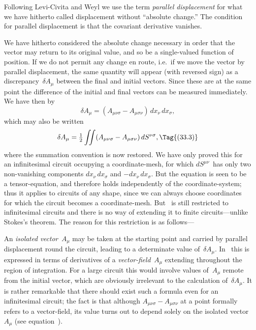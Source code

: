 \documentclass[12pt]{book}
\begin{document}
Following Levi-Civita and Weyl we use the term \emph{parallel displacement} for
%
%
what we have hitherto called displacement without ``absolute change.'' The
condition for parallel displacement is that the covariant derivative vanishes.

We have hitherto considered the absolute change necessary in order that
the vector may return to its original value, and so be a single-valued function
of position. If we do not permit any change en route, i.e.\ if we move the vector
by parallel displacement, the same quantity will appear (with reversed sign)
as a discrepancy~$\delta A_{\mu}$ between the final and initial vectors. Since these are at
the same point the difference of the initial and final vectors can be measured
immediately. We have then by~
\[
\delta A_{\mu} = (A_{\mu\nu\sigma} - A_{\mu\sigma\nu})\, dx_{\nu}\, dx_{\sigma},
\]
which may also be written
\[
\delta A_{\mu} = \tfrac{1}{2} \iint (A_{\mu\nu\sigma} - A_{\mu\sigma\nu})\, dS^{\nu\sigma},
\Tag{(33.3)}
\]
where the summation convention is now restored. We have only proved this
for an infinitesimal circuit occupying a coordinate-mesh, for which $dS^{\mu\nu}$~has
only two non-vanishing components $dx_{\nu}\, dx_{\sigma}$ and $-dx_{\nu}\, dx_{\sigma}$. But the equation
is seen to be a tensor-equation, and therefore holds independently of the
coordinate-system; thus it applies to circuits of any shape, since we can always
choose coordinates for which the circuit becomes a coordinate-mesh. But ~is
still restricted to infinitesimal circuits and there is no way of extending it
to finite circuits---unlike Stokes's theorem. The reason for this restriction is as
follows---

An \emph{isolated vector~$A_{\mu}$} may be taken at the starting point and carried by
parallel displacement round the circuit, leading to a determinate value of~$\delta A_{\mu}$.
%
%
In~ this is expressed in terms of derivatives of a \emph{vector-field~$A_{\mu}$} extending
throughout the region of integration. For a large circuit this would involve
values of~$A_{\mu}$ remote from the initial vector, which are obviously irrelevant to
the calculation of~$\delta A_{\mu}$. It is rather remarkable that there should exist such
a formula even for an infinitesimal circuit; the fact is that although $A_{\mu\nu\sigma} - A_{\mu\sigma\nu}$
at a point formally refers to a vector-field, its value turns out to depend solely
on the isolated vector~$A_{\mu}$ (see equation~).
\end{document}
